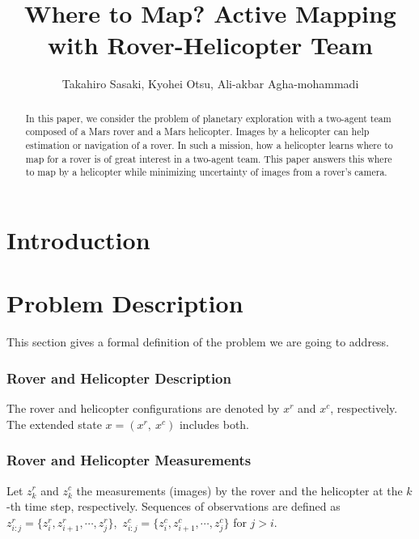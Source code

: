 \documentclass[conference]{IEEEtran}
\begin{document}
\title{\huge Where to Map? Active Mapping with Rover-Helicopter Team}

\author{Takahiro Sasaki, Kyohei Otsu, Ali-akbar Agha-mohammadi}

\maketitle

\begin{abstract}
In this paper, we consider the problem of planetary exploration with a two-agent team composed of a Mars rover and a Mars helicopter. Images by a helicopter can help estimation or navigation of a rover. In such a mission, how a helicopter learns where to map for a rover is of great interest in a two-agent team. 
This paper answers this where to map by a helicopter while minimizing uncertainty of images from a rover’s camera.
\end{abstract}

\IEEEpeerreviewmaketitle

\section{Introduction}


\section{Problem Description}
This section gives a formal definition of the problem we are going to address. 

\subsubsection*{Rover and Helicopter Description}
The rover and helicopter configurations are denoted by $x^r$ and $x^c$, respectively. The extended state $x=(x^r,~x^c)$ includes both.

\subsubsection*{Rover and Helicopter Measurements}
Let $z^r_k$ and $z^c_k$ the measurements (images) by the rover and the helicopter at the $k$-th time step, respectively. Sequences of observations are defined as $z^r_{i:j}=\{z^r_i,z^r_{i+1},\cdots,z^r_j\}$,~$z^c_{i:j}=\{z^c_i,z^c_{i+1},\cdots,z^c_j\}$ for $j>i$.
\end{document}
